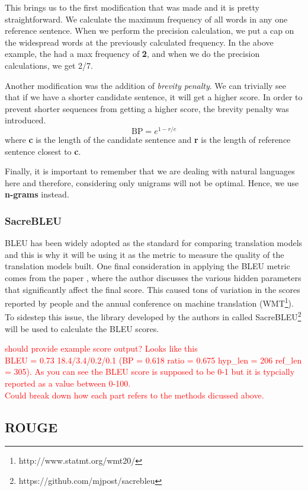 \documentclass[12pt,a4paper,twoside,openright]{report}
\newcommand{\red}[1]{\textcolor{red}{#1}}
\newcommand{\changedFont}[1]{{\fontfamily{qcr}\selectfont #1}}
\begin{document}
This brings us to the first modification that was made and it is pretty straightforward. We calculate the maximum frequency of all words in any one reference sentence. When we perform the precision calculation, we put a cap on the widespread words at the previously calculated frequency. In the above example, \changedFont{the} had a max frequency of \textbf{2}, and when we do the precision calculations, we get 2/7.

Another modification was the addition of \textit{brevity penalty}. We can trivially see that if we have a shorter candidate sentence, it will get a higher score. In order to prevent shorter sequences from getting a higher score, the brevity penalty was introduced. 
\[ \text{BP} = e^{1-r/c}\]
where \textbf{c} is the length of the candidate sentence and \textbf{r} is the length of reference sentence closest to \textbf{c}. 

Finally, it is important to remember that we are dealing with natural languages here and therefore, considering only unigrams will not be optimal. Hence, we use \textbf{n-grams} instead. 

\subsubsection{SacreBLEU}
BLEU has been widely adopted as the standard for comparing translation models and this is why it will be using it as the metric to measure the quality of the translation models built. One final consideration in applying the BLEU metric comes from the paper \cite{sacrebleu}, where the author discusses the various hidden parameters that significantly affect the final score. This caused tons of variation in the scores reported by people and the annual conference on machine translation (WMT\footnote{http://www.statmt.org/wmt20/}). To sidestep this issue, the library developed by the authors in \cite{sacrebleu} called SacreBLEU\footnote{https://github.com/mjpost/sacrebleu} will be used to calculate the BLEU scores. 

\red{should provide example score output? Looks like this\\ BLEU = 0.73 18.4/3.4/0.2/0.1 (BP = 0.618 ratio = 0.675 hyp\_len = 206 ref\_len = 305). As you can see the BLEU score is supposed to be 0-1 but it is typcially reported as a value between 0-100.\\ Could break down how each part refers to the methods dicussed above.}


\subsection{ROUGE}
\label{rouge}
\end{document}
